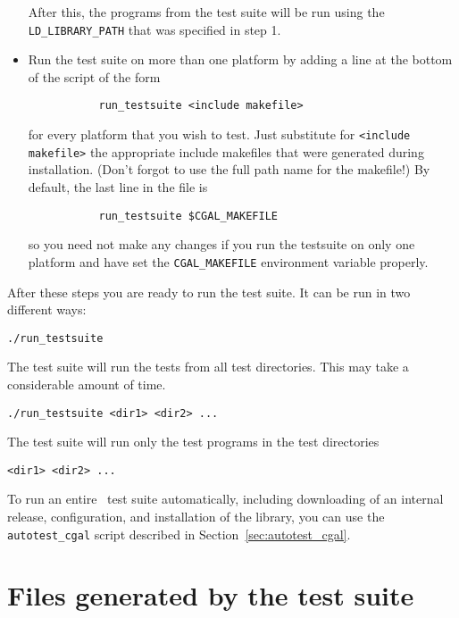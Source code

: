 \begin{itemize}
      After this, the programs from the test suite will be run using the
      {\tt LD\_LIBRARY\_PATH} that was specified in step 1. 

\item Run the test suite on more than one platform by adding a line at the 
      bottom of the script of the form
      \begin{verbatim}
           run_testsuite <include makefile>
      \end{verbatim}
      for every platform that you wish to test. Just substitute for
      \verb|<include makefile>| the appropriate include makefiles that
      were generated during installation. (Don't forgot to use the
      full path name for the makefile!)  By default, the last line in the
      file is
      \begin{verbatim}
           run_testsuite $CGAL_MAKEFILE
      \end{verbatim}
      so you need not make any changes if you run the testsuite on only one
      platform and have set the {\tt CGAL\_MAKEFILE} environment variable
      properly.%
\end{itemize}

After these steps you are ready to run the test suite. It can be run in two
different ways:
\begin{verbatim}
./run_testsuite
\end{verbatim}

The test suite will run the tests from all test directories. This may take a
considerable amount of time.

\begin{verbatim}
./run_testsuite <dir1> <dir2> ...
\end{verbatim}

The test suite will run only the test programs in the test directories
\begin{verbatim}<dir1> <dir2> ... \end{verbatim}

To run an entire \cgal\ test suite automatically, including downloading of
an internal release, configuration, and installation of the library, you 
can use the {\tt autotest\_cgal} script described in 
Section~\ref{sec:autotest_cgal}.


\section{Files generated by the test suite\label{sec:test_suite_output}}

